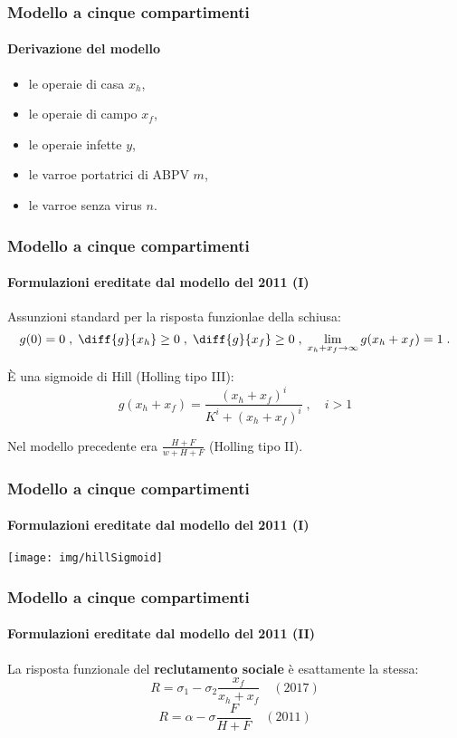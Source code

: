 \documentclass[]{beamer} %
\begin{document}
\begin{frame}
    \frametitle{Modello a cinque compartimenti}
    \framesubtitle{Derivazione del modello}

    \begin{itemize}
        \item le operaie di casa $x_h$,
        \item \pause le operaie di campo $x_f$,
        \item \pause le operaie infette $y$,
        \item \pause le varroe portatrici di ABPV $m$,
        \item \pause le varroe senza virus $n$.
    \end{itemize}
\end{frame}

\begin{frame}
    \frametitle{Modello a cinque compartimenti}
    \framesubtitle{Formulazioni ereditate dal modello del 2011 (I)}

    Assunzioni standard per la risposta funzionlae della schiusa:
    $$g(0)=0 \; , \; \diff{g}{x_h} \geq 0 \; , \; \diff{g}{x_f} \geq 0 \; , %
        \; \lim_{x_h+x_f \to \infty} g(x_h+x_f)=1 \; .$$

    \pause
    È una sigmoide di Hill (Holling tipo III):
    $$g(x_h + x_f) = \frac{ (x_h+x_f)^i }{ K^i + (x_h+x_f)^i } \; , \quad i>1$$

    Nel modello precedente era $\frac{H+F}{w+H+F}$ (Holling tipo II).
\end{frame}

\begin{frame}
    \frametitle{Modello a cinque compartimenti}
    \framesubtitle{Formulazioni ereditate dal modello del 2011 (I)}

    \begin{center}
            \texttt{[image: img/hillSigmoid]}
    \end{center}
\end{frame}

\begin{frame}
    \frametitle{Modello a cinque compartimenti}
    \framesubtitle{Formulazioni ereditate dal modello del 2011 (II)}

    La risposta funzionale del \textbf{reclutamento sociale} è esattamente la stessa:
    $$R = \sigma_1 - \sigma_2 \frac{x_f}{x_h+x_f} \quad (2017)$$
    \pause
    $$R = \alpha - \sigma \frac{F}{H+F} \quad (2011)$$
\end{frame}
%
\end{document}
